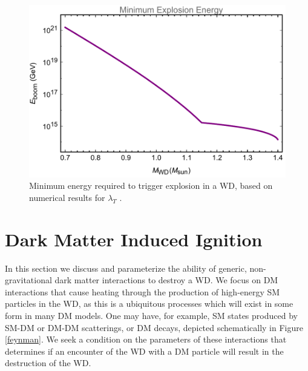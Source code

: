 \documentclass[twocolumn,showpacs,preprintnumbers,amsmath,amssymb,prd]{revtex4}
\begin{document}
\begin{figure}
\includegraphics[scale=.45]{Eboom.pdf}
\caption{Minimum energy required to trigger explosion in a WD, based on numerical results for $\lambda_T$ \cite{Woosley}.}
\label{fig:Eboom}
\end{figure}

\section{Dark Matter Induced Ignition}
\label{sec:DMexplode}

In this section we discuss and parameterize the ability of generic, non-gravitational dark matter interactions to destroy a WD.  We focus on DM interactions that cause heating through the production of high-energy SM particles in the WD, as this is a ubiquitous processes which will exist in some form in many DM models.  One may have, for example, SM states produced by SM-DM or DM-DM scatterings, or DM decays, depicted schematically in Figure \ref{feynman}.  We seek a condition on the parameters of these interactions that determines if an encounter of the WD with a DM particle will result in the destruction of the WD.
\end{document}
